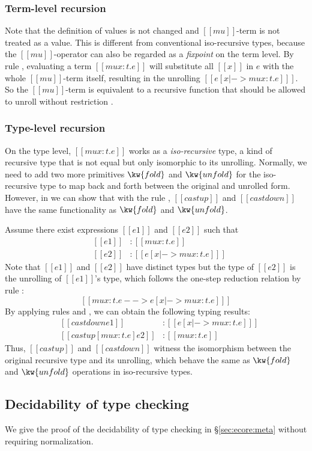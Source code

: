\subsubsection{Term-level recursion}
Note that the definition of values is not changed and $[[mu]]$-term is not treated as a value. This is different from conventional iso-recursive types, because the $[[mu]]$-operator can also be regarded as a \emph{fixpoint} on the term level. By rule , evaluating a term $[[mu x:t.e]]$ will substitute all $[[x]]$ in $e$ with the whole $[[mu]]$-term itself, resulting in the unrolling $[[e [x |-> mu x:t.e] ]]$. So the $[[mu]]$-term is equivalent to a recursive function that should be allowed to unroll without restriction .

\subsubsection{Type-level recursion}
On the type level, $[[mu x:t.e]]$ works as a \emph{iso-recursive} type, a kind of recursive type that is not equal but only isomorphic to its unrolling. Normally, we need to add two more primitives $\kw{fold}$ and $\kw{unfold}$ for the iso-recursive type to map back and forth between the original and unrolled form. However, in \name we can show that with the rule , $[[castup]]$ and $[[castdown]]$ have the same functionality as $\kw{fold}$ and $\kw{unfold}$.

Assume there exist expressions $[[e1]]$ and $[[e2]]$ such that 
\[\begin{array}{lll}
	&[[e1]] &: [[mu x:t.e]]\\
	&[[e2]] &: [[e [x |-> mu x:t.e] ]]
\end{array}\]
Note that $[[e1]]$ and $[[e2]]$ have distinct types but the type of $[[e2]]$ is the unrolling of $[[e1]]$'s type, which follows the one-step reduction relation by rule :
\[ [[mu x:t.e --> e [x |-> mu x:t.e] ]] \]
By applying rules  and , we can obtain the following typing results:
\[\begin{array}{lll}
	&[[castdown e1]] &: [[e [x |-> mu x:t.e] ]]\\
	&[[castup [mu x:t.e] e2]] &: [[mu x:t.e]]
\end{array}\]
Thus, $[[castup]]$ and $[[castdown]]$ witness the isomorphism between the original recursive type and its unrolling, which behave the same as $\kw{fold}$ and $\kw{unfold}$ operations in iso-recursive types.

\subsection{Decidability of type checking}
We give the proof of the decidability of type checking \ecore in \S \ref{sec:ecore:meta} without requiring normalization. 


